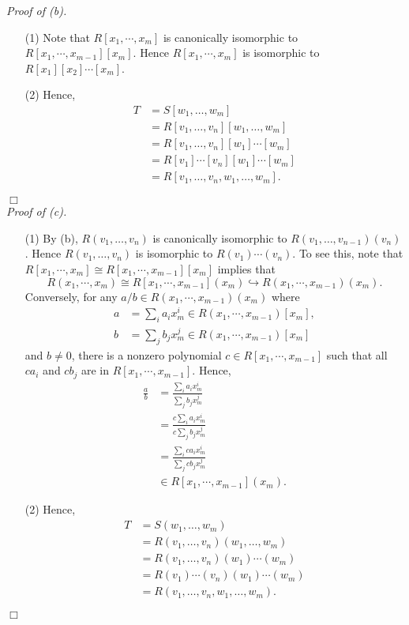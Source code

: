 \documentclass{article}
\begin{document}
\emph{Proof of (b).}
\begin{enumerate}
\item[(1)]
  Note that $R[x_1,\cdots,x_m]$ is canonically isomorphic to $R[x_1,\cdots,x_{m-1}][x_m]$.
  Hence $R[x_1,\cdots,x_m]$ is isomorphic to $R[x_1][x_2] \cdots [x_m]$.

\item[(2)]
  Hence,
  \begin{align*}
    T
    &= S[w_1,\ldots,w_m] \\
    &= R[v_1,\ldots,v_n][w_1,\ldots,w_m] \\
    &= R[v_1,\ldots,v_n][w_1] \cdots [w_m] \\
    &= R[v_1] \cdots [v_n][w_1] \cdots [w_m] \\
    &= R[v_1,\ldots,v_n,w_1,\ldots,w_m].
  \end{align*}
\end{enumerate}
$\Box$ \\



\emph{Proof of (c).}
\begin{enumerate}
\item[(1)]
  By (b),
  $R(v_1,\ldots,v_n)$ is canonically isomorphic to $R(v_1,\ldots,v_{n-1})(v_n)$.
  Hence $R(v_1,\ldots,v_n)$ is isomorphic to $R(v_1) \cdots (v_n)$.
  To see this, note that $R[x_1,\cdots,x_m] \cong R[x_1,\cdots,x_{m-1}][x_m]$
  implies that
  \[
    R(x_1,\cdots,x_m)
    \cong R[x_1,\cdots,x_{m-1}](x_m)
    \hookrightarrow R(x_1,\cdots,x_{m-1})(x_m).
  \]
  Conversely,
  for any $a/b \in R(x_1,\cdots,x_{m-1})(x_m)$
  where
  \begin{align*}
    a &= \sum_{i} a_i x_m^{i} \in R(x_1,\cdots,x_{m-1})[x_m], \\
    b &= \sum_{j} b_j x_m^{j} \in R(x_1,\cdots,x_{m-1})[x_m]
  \end{align*}
  and $b \neq 0$, there is a nonzero polynomial $c \in R[x_1,\cdots,x_{m-1}]$
  such that all $c a_i$ and $c b_j$ are in $R[x_1,\cdots,x_{m-1}]$.
  Hence,
  \begin{align*}
    \frac{a}{b}
    &= \frac{\sum_{i} a_i x_m^{i}}{\sum_{j} b_j x_m^{j}} \\
    &= \frac{c\sum_{i} a_i x_m^{i}}{c\sum_{j} b_j x_m^{j}} \\
    &= \frac{\sum_{i} ca_i x_m^{i}}{\sum_{j} cb_j x_m^{j}} \\
    &\in R[x_1,\cdots,x_{m-1}](x_m).
  \end{align*}

\item[(2)]
  Hence,
  \begin{align*}
    T
    &= S(w_1,\ldots,w_m) \\
    &= R(v_1,\ldots,v_n)(w_1,\ldots,w_m) \\
    &= R(v_1,\ldots,v_n)(w_1) \cdots (w_m) \\
    &= R(v_1) \cdots (v_n)(w_1) \cdots (w_m) \\
    &= R(v_1,\ldots,v_n,w_1,\ldots,w_m).
  \end{align*}
\end{enumerate}
$\Box$ \\\\
\end{document}
